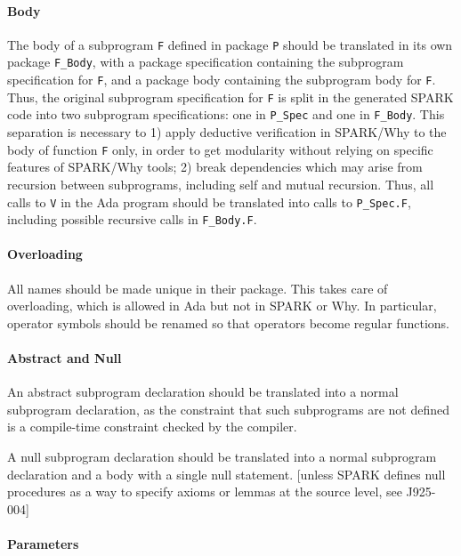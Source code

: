 \documentclass{article}
\begin{document}
\paragraph{Body}

The body of a subprogram \verb|F| defined in package \verb|P| should be
translated in its own package \verb|F_Body|, with a package specification
containing the subprogram specification for \verb|F|, and a package body
containing the subprogram body for \verb|F|. Thus, the original subprogram
specification for \verb|F| is split in the generated SPARK code into two
subprogram specifications: one in \verb|P_Spec| and one in \verb|F_Body|. This
separation is necessary to 1) apply deductive verification in SPARK/Why to the
body of function \verb|F| only, in order to get modularity without relying on
specific features of SPARK/Why tools; 2) break dependencies which may arise
from recursion between subprograms, including self and mutual recursion.  Thus,
all calls to \verb|V| in the Ada program should be translated into calls to
\verb|P_Spec.F|, including possible recursive calls in \verb|F_Body.F|.

\paragraph{Overloading}

All names should be made unique in their package. This takes care of
overloading, which is allowed in Ada but not in SPARK or Why. In particular,
operator symbols should be renamed so that operators become regular functions.

\paragraph{Abstract and Null}

An abstract subprogram declaration should be translated into a normal
subprogram declaration, as the constraint that such subprograms are not defined
is a compile-time constraint checked by the compiler.

A null subprogram declaration should be translated into a normal subprogram
declaration and a body with a single null statement. [unless SPARK defines null
procedures as a way to specify axioms or lemmas at the source level, see
J925-004]

\paragraph{Parameters} 
\end{document}
